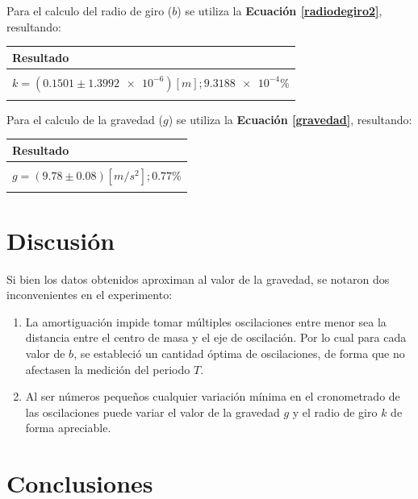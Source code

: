 \documentclass[letter,11pt]{article}
\begin{document}
Para el calculo del radio de giro ($b$) se utiliza la
\textbf{Ecuación \ref{radiodegiro2}}, resultando:

\begin{center}
\begin{tabular}{|>{\centering}m{9.2cm}<{\centering}|}
\hline
\textbf{Resultado} 
\tabularnewline \hline
\\
$k = (0.1501 \pm \num{1.3992e-6}) [m]; \num{9.3188e-4}\%$ \tabularnewline
\\
\hline
\end{tabular}
\end{center}
\vspace{0.10cm}

Para el calculo de la gravedad ($g$) se utiliza la
\textbf{Ecuación \ref{gravedad}}, resultando:

\begin{center}
\begin{tabular}{|>{\centering}m{9.2cm}<{\centering}|}
\hline
\textbf{Resultado} 
\tabularnewline \hline
\\
$g = (9.78 \pm 0.08) [m/s^2]; 0.77\%$ \tabularnewline
\\
\hline
\end{tabular}
\end{center}
\vspace{0.10cm}

\section{Discusión}

Si bien los datos obtenidos aproximan al valor de la gravedad, se notaron dos
inconvenientes en el experimento:

\begin{enumerate}
\item La amortiguación impide tomar múltiples oscilaciones entre menor sea
la distancia entre el centro de masa y el eje de oscilación. Por lo cual para
cada valor de $b$, se estableció un cantidad óptima de oscilaciones, de forma
que no afectasen la medición del periodo $T$.
\item Al ser números pequeños cualquier variación mínima en el cronometrado
de las oscilaciones puede variar el valor de la gravedad $g$ y el radio de giro
$k$ de forma apreciable.
\end{enumerate}

\section{Conclusiones}
\end{document}
